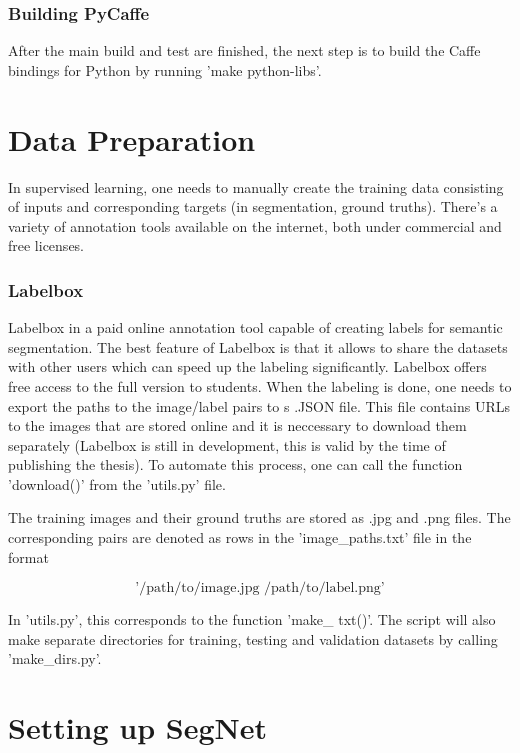\subsubsection{Building PyCaffe}

After the main build and test are finished, the next step is to build the Caffe bindings for Python by running 'make python-libs'.

\section{Data Preparation}

In supervised learning, one needs to manually create the training data consisting of inputs and corresponding targets (in segmentation, ground truths). There's a variety of annotation tools available on the internet, both under commercial and free licenses. 

\subsubsection{Labelbox}

Labelbox in a paid online annotation tool capable of creating labels for semantic segmentation. The best feature of Labelbox is that it allows to share the datasets with other users which can speed up the labeling significantly. Labelbox offers free access to the full version to students. When the labeling is done, one needs to export the paths to the image/label pairs to s .JSON file. This file contains URLs to the images that are stored online and it is neccessary to download them separately (Labelbox is still in development, this is valid by the time of publishing the thesis). To automate this process, one can call the function 'download()' from the 'utils.py' file. 

The training images and their ground truths are stored as .jpg and .png files. The corresponding pairs are denoted as rows in the 'image\_paths.txt' file in the format 

$$
\text{'/path/to/image.jpg /path/to/label.png'}
$$

In 'utils.py', this corresponds to the function 'make\_ txt()'. The script will also make separate directories for training, testing and validation datasets by calling 'make\_dirs.py'.

\section{Setting up SegNet}

